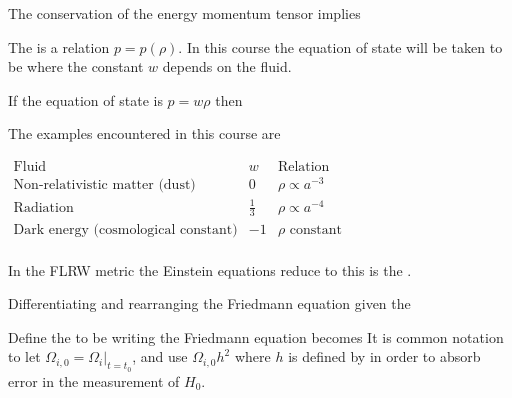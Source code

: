 \documentclass{article}
\begin{document}
\begin{definition}
The conservation of the energy momentum tensor implies 
\end{definition}

\begin{definition}
The  is a relation $p=p(\rho)$. In this course the equation of state will be taken to be 
where the constant $w$ depends on the fluid.
\end{definition}

\begin{prop}
If the equation of state is $p = w\rho$ then 
\end{prop}

The examples encountered in this course are 
\begin{center}$
\begin{array}{ccc}
    \text{Fluid} & w & \text{Relation} \\
    \hline
    \hline
    \text{Non-relativistic matter (dust)} & 0 & \rho\propto a^{-3}  \\
    \text{Radiation} & \frac{1}{3} & \rho\propto a^{-4} \\
    \text{Dark energy (cosmological constant)} & -1 & \rho \text{ constant} \\
\end{array}
$\end{center}

\begin{definition}
In the FLRW metric the Einstein equations reduce to 
this is the . 
\end{definition}

\begin{definition}
Differentiating and rearranging the Friedmann equation given the 
\end{definition}

\begin{definition}
Define the  to be 
writing 
the Friedmann equation becomes 
It is common notation to let $\Omega_{i,0} = \Omega_i |_{t=t_0}$, and use $\Omega_{i,0} h^2$ where $h$ is defined by 
in order to absorb error in the measurement of $H_0$. 
\end{definition}
\end{document}
